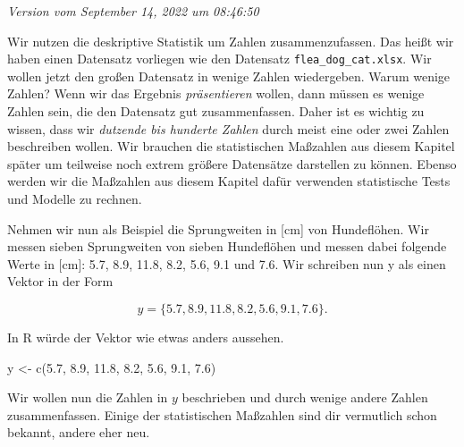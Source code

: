 \documentclass[
  letterpaper,
]{scrbook}
\newenvironment{Shaded}{\begin{snugshade}}{\end{snugshade}}
\newcommand{\FloatTok}[1]{\textcolor[rgb]{0.68,0.00,0.00}{#1}}
\newcommand{\FunctionTok}[1]{\textcolor[rgb]{0.28,0.35,0.67}{#1}}
\newcommand{\NormalTok}[1]{\textcolor[rgb]{0.00,0.23,0.31}{#1}}
\newcommand{\OtherTok}[1]{\textcolor[rgb]{0.00,0.23,0.31}{#1}}
\begin{document}
\emph{Version vom September 14, 2022 um 08:46:50}

{}

Wir nutzen die deskriptive Statistik um Zahlen zusammenzufassen. Das
heißt wir haben einen Datensatz vorliegen wie den Datensatz
\texttt{flea\_dog\_cat.xlsx}. Wir wollen jetzt den großen Datensatz in
wenige Zahlen wiedergeben. Warum wenige Zahlen? Wenn wir das Ergebnis
\emph{präsentieren} wollen, dann müssen es wenige Zahlen sein, die den
Datensatz gut zusammenfassen. Daher ist es wichtig zu wissen, dass wir
\emph{dutzende bis hunderte Zahlen} durch meist eine oder zwei Zahlen
beschreiben wollen. Wir brauchen die statistischen Maßzahlen aus diesem
Kapitel später um teilweise noch extrem größere Datensätze darstellen zu
können. Ebenso werden wir die Maßzahlen aus diesem Kapitel dafür
verwenden statistische Tests und Modelle zu rechnen.

Nehmen wir nun als Beispiel die Sprungweiten in {[}cm{]} von
Hundeflöhen. Wir messen sieben Sprungweiten von sieben Hundeflöhen und
messen dabei folgende Werte in {[}cm{]}: 5.7, 8.9, 11.8, 8.2, 5.6, 9.1
und 7.6. Wir schreiben nun y als einen Vektor in der Form

\[
y = \{5.7, 8.9, 11.8, 8.2, 5.6, 9.1, 7.6\}.
\]

In R würde der Vektor wie etwas anders aussehen.

\begin{Shaded}
\begin{Highlighting}[]
\NormalTok{y }\OtherTok{\textless{}{-}} \FunctionTok{c}\NormalTok{(}\FloatTok{5.7}\NormalTok{, }\FloatTok{8.9}\NormalTok{, }\FloatTok{11.8}\NormalTok{, }\FloatTok{8.2}\NormalTok{, }\FloatTok{5.6}\NormalTok{, }\FloatTok{9.1}\NormalTok{, }\FloatTok{7.6}\NormalTok{) }
\end{Highlighting}
\end{Shaded}

Wir wollen nun die Zahlen in \(y\) beschrieben und durch wenige andere
Zahlen zusammenfassen. Einige der statistischen Maßzahlen sind dir
vermutlich schon bekannt, andere eher neu.
\end{document}
